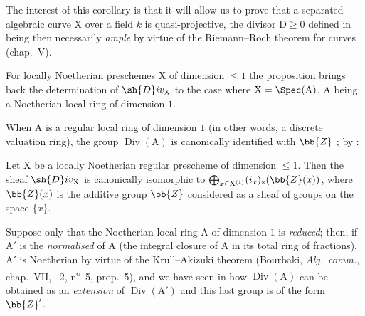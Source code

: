 The interest of this corollary is that it will allow us to prove that a separated algebraic curve $\mathrm{X}$ over a field $k$ is quasi-projective, the divisor $\mathrm{D}\geq 0$ defined in  being then necessarily \emph{ample} by virtue of the Riemann--Roch theorem for curves (chap.~V).

\begin{env}[21.9.8]
\label{IV.21.9.8}
For locally Noetherian preschemes $\mathrm{X}$ of dimension $\leq 1$ the proposition  brings back the determination of $\sh{D}iv_\mathrm{X}$ to the case where $\mathrm{X}=\Spec(\mathrm{A})$, $\mathrm{A}$ being a Noetherian local ring of dimension $1$.

When $\mathrm{A}$ is a regular local ring of dimension $1$ (in other words, a discrete valuation ring), the group $\operatorname{Div}(\mathrm{A})$ is canonically identified with $\bb{Z}$ ;
by :
\end{env}

\begin{proposition}[21.9.9]
\label{IV.21.9.9}
Let $\mathrm{X}$ be a locally Noetherian regular prescheme of dimension $\leq 1$.
Then the sheaf $\sh{D}iv_\mathrm{X}$ is canonically isomorphic to $\bigoplus_{x\in\mathrm{X}^{(1)}}(i_x)_*(\bb{Z}(x))$, where $\bb{Z}(x)$ is the additive group $\bb{Z}$ considered as a sheaf of groups on the space $\{x\}$.
\end{proposition}

\begin{env}[21.9.10]
\label{IV.21.9.10}
Suppose only that the Noetherian local ring $\mathrm{A}$ of dimension $1$ is \emph{reduced};
then, if $\mathrm{A}'$ is the \emph{normalised} of $\mathrm{A}$ (the integral closure of $\mathrm{A}$ in its total ring of fractions), $\mathrm{A}'$ is Noetherian by virtue of the Krull--Akizuki theorem (Bourbaki, \emph{Alg.\ comm.}, chap.~VII, \textsection~2, n\textsuperscript{o}~5, prop.~5), and we have seen in  how
$\operatorname{Div}(\mathrm{A})$ can be obtained as an \emph{extension} of $\operatorname{Div}(\mathrm{A}')$ and this last group is of the form $\bb{Z}'$.
\end{env}

